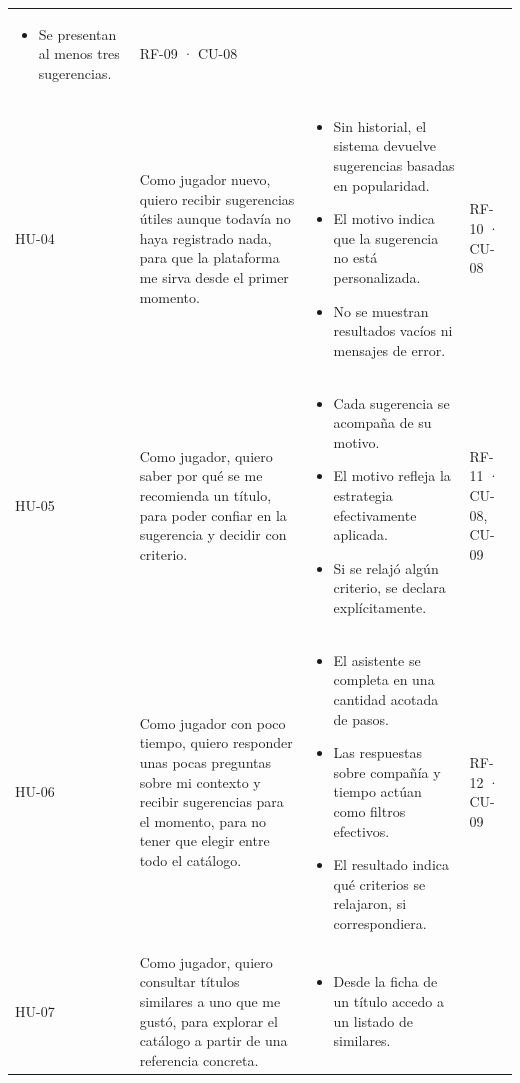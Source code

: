 \begin{longtable}{|>{\raggedright\arraybackslash}p{1cm}|>{\raggedright\arraybackslash}p{4.6cm}|>{\raggedright\arraybackslash}p{5.2cm}|>{\raggedright\arraybackslash}p{2cm}|}
\begin{itemize}[leftmargin=1em, itemsep=1pt, topsep=1pt]
		\item Se presentan al menos tres sugerencias.
	\end{itemize} & RF-09 · CU-08 \\
	HU-04 & Como jugador nuevo, quiero recibir sugerencias útiles aunque todavía no haya registrado nada, para que la plataforma me sirva desde el primer momento. &
	\begin{itemize}[leftmargin=1em, itemsep=1pt, topsep=1pt]
		\item Sin historial, el sistema devuelve sugerencias basadas en popularidad.
		\item El motivo indica que la sugerencia no está personalizada.
		\item No se muestran resultados vacíos ni mensajes de error.
	\end{itemize} & RF-10 · CU-08 \\
	HU-05 & Como jugador, quiero saber por qué se me recomienda un título, para poder confiar en la sugerencia y decidir con criterio. &
	\begin{itemize}[leftmargin=1em, itemsep=1pt, topsep=1pt]
		\item Cada sugerencia se acompaña de su motivo.
		\item El motivo refleja la estrategia efectivamente aplicada.
		\item Si se relajó algún criterio, se declara explícitamente.
	\end{itemize} & RF-11 · CU-08, CU-09 \\
	HU-06 & Como jugador con poco tiempo, quiero responder unas pocas preguntas sobre mi contexto y recibir sugerencias para el momento, para no tener que elegir entre todo el catálogo. &
	\begin{itemize}[leftmargin=1em, itemsep=1pt, topsep=1pt]
		\item El asistente se completa en una cantidad acotada de pasos.
		\item Las respuestas sobre compañía y tiempo actúan como filtros efectivos.
		\item El resultado indica qué criterios se relajaron, si correspondiera.
	\end{itemize} & RF-12 · CU-09 \\
	HU-07 & Como jugador, quiero consultar títulos similares a uno que me gustó, para explorar el catálogo a partir de una referencia concreta. &
	\begin{itemize}[leftmargin=1em, itemsep=1pt, topsep=1pt]
		\item Desde la ficha de un título accedo a un listado de similares.

\end{itemize}
\end{longtable}
